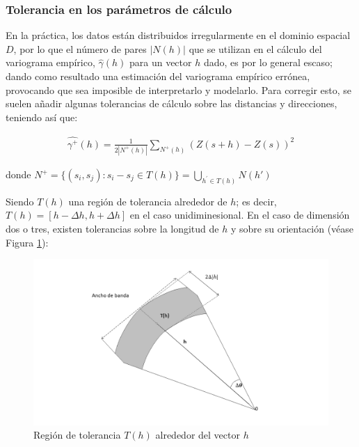 \documentclass[
]{book}
\begin{document}
\hypertarget{tolerancia-en-los-paruxe1metros-de-cuxe1lculo}{%
\subsubsection*{Tolerancia en los parámetros de cálculo}\label{tolerancia-en-los-paruxe1metros-de-cuxe1lculo}}

En la práctica, los datos están distribuidos irregularmente en el dominio espacial \(D\), por lo que el número de pares \(|N(h)|\) que se utilizan en el cálculo del variograma empírico, \(\hat{\gamma}(h)\) para un vector \(h\) dado, es por lo general escaso; dando como resultado una estimación del variograma empírico errónea, provocando que sea imposible de interpretarlo y modelarlo. Para corregir esto, se suelen añadir algunas tolerancias de cálculo sobre las distancias y direcciones, teniendo así que:

\begin{align*}
  \hat{\gamma^+}(h)=\frac{1}{2|N^+(h)|}\sum_{N^+(h)}(Z(s+h)-Z(s))^2  
\end{align*}

donde \(N^+=\{(s_i,s_j): s_i-s_j\in T(h)\}=\displaystyle \bigcup_{h^{'}\in T(h)}N(h')\)

Siendo \(T(h)\) una región de tolerancia alrededor de \(h\); es decir, \(T(h)=[h-\Delta h,h+\Delta h]\) en el caso unidiminesional. En el caso de dimensión dos o tres, existen tolerancias sobre la longitud de \(h\) y sobre su orientación \citep{emery} (véase Figura \ref{fig:regtol}):

\begin{figure}
\includegraphics[width=17.78in]{figuras/otros/tolerancia} \caption{Región de tolerancia $T(h)$ alrededor del vector $h$}\label{fig:regtol}
\end{figure}
\end{document}
